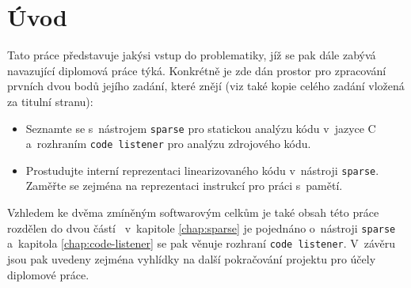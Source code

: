 \chapter*{Úvod}
\label{chap:uvod}

Tato práce představuje jakýsi vstup do problematiky, jíž se pak dále
zabývá navazující diplomová práce týká. Konkrétně je zde dán prostor
pro zpracování prvních dvou bodů jejího zadání, které znějí (viz také kopie
celého zadání vložená za titulní stranu):

\begin{itemize}
    \item Seznamte se s~nástrojem \texttt{sparse} pro statickou analýzu kódu v~jazyce C
          a~rozhraním \texttt{code listener} pro analýzu zdrojového kódu.
    \item Prostudujte interní reprezentaci linearizovaného kódu v~nástroji \texttt{sparse}.
          Zaměřte se zejména na reprezentaci instrukcí pro práci s~pamětí. 
\end{itemize}

Vzhledem ke dvěma zmíněným softwarovým celkům je také obsah této práce rozdělen do
dvou částí \ndash\ v~kapitole \ref{chap:sparse} je pojednáno o~nástroji \texttt{sparse}
a~kapitola \ref{chap:code-listener} se pak věnuje rozhraní \texttt{code listener}.
V~závěru jsou pak uvedeny zejména vyhlídky na další pokračování projektu
pro účely diplomové práce.
